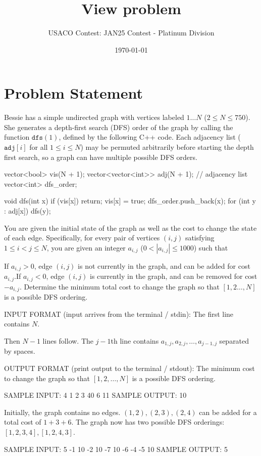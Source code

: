 \documentclass[12pt]{article}
\title{View problem}
\author{USACO Contest: JAN25 Contest - Platinum Division}
\date{\today}
\begin{document}
\maketitle

\section*{Problem Statement}


Bessie has a simple undirected graph with vertices labeled $1\dots N$
($2\le N\le 750$).  She generates a depth-first search (DFS) order of the graph
by calling the function $\texttt{dfs}(1)$, defined by the following C++ code.
Each adjacency list ($\texttt{adj}[i]$ for all $1\le i\le N$) may be permuted arbitrarily before starting
the depth first search, so a graph can have multiple possible DFS orders.


vector<bool> vis(N + 1);
vector<vector<int>> adj(N + 1);  // adjacency list
vector<int> dfs_order;

void dfs(int x) {
    if (vis[x]) return;
    vis[x] = true;
    dfs_order.push_back(x);
    for (int y : adj[x]) dfs(y);
}

You are given the initial state of the graph as well as the cost to change the
state of each edge. Specifically, for every pair of vertices $(i,j)$ satisfying
$1\le i<j\le N$, you are given an integer $a_{i,j}$ ($0<|a_{i,j}|\le 1000$) such
that

If $a_{i,j}>0$, edge $(i,j)$ is not currently in the graph, and can be added
for cost $a_{i,j}$.If $a_{i,j}<0$, edge $(i,j)$ is currently in the graph, and can be removed
for cost $-a_{i,j}$.
Determine the minimum total cost to change the graph so that $[1,2\dots,N]$ is a
possible DFS ordering.

INPUT FORMAT (input arrives from the terminal / stdin):
The first line contains $N$.

Then $N-1$ lines follow. The $j-1$th line contains
$a_{1,j}, a_{2,j}, \dots, a_{j-1,j}$ separated by spaces.

OUTPUT FORMAT (print output to the terminal / stdout):
The minimum cost to change the graph so that $[1,2,\dots, N]$ is a possible DFS
ordering.

SAMPLE INPUT:
4
1
2 3
40 6 11
SAMPLE OUTPUT: 
10

Initially, the graph contains no edges. $(1,2),(2,3),(2,4)$ can be added for a
total cost of $1+3+6$. The graph now has two possible DFS orderings:
$[1,2,3,4],[1,2,4,3]$.

SAMPLE INPUT:
5
-1
10 -2
10 -7 10
-6 -4 -5 10
SAMPLE OUTPUT: 
5
\end{document}
